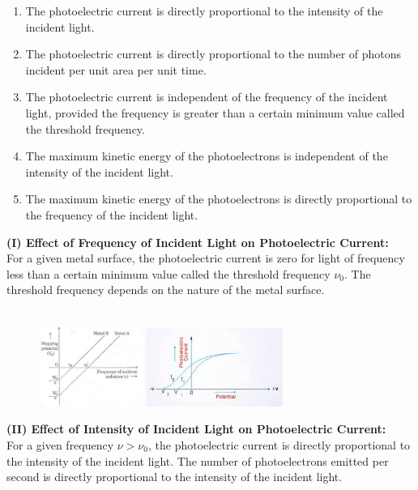 \documentclass[12pt]{article}
\numberwithin{equation}{subsection}
\begin{document}
\begin{enumerate}
    \item The photoelectric current is directly proportional to the intensity of the incident light.
    \item The photoelectric current is directly proportional to the number of photons incident per unit area per unit time.
    \item The photoelectric current is independent of the frequency of the incident light, provided the frequency is greater than a certain minimum value called the threshold frequency.
    \item The maximum kinetic energy of the photoelectrons is independent of the intensity of the incident light.
    \item The maximum kinetic energy of the photoelectrons is directly proportional to the frequency of the incident light.
\end{enumerate}

\textbf{(I) Effect of Frequency of Incident Light on Photoelectric Current:} \\
For a given metal surface, the photoelectric current is zero for light of frequency less than a certain minimum value called the threshold frequency $\nu_0$. The threshold frequency depends on the nature of the metal surface. \\~\\

\begin{figure}[htpb]
    \centering
    \includegraphics[width=0.3\textwidth]{frequency.png}
    \includegraphics[width=0.4\textwidth]{frequency2.png}
\end{figure}

\textbf{(II) Effect of Intensity of Incident Light on Photoelectric Current:} \\
For a given frequency $\nu > \nu_0$, the photoelectric current is directly proportional to the intensity of the incident light. The number of photoelectrons emitted per second is directly proportional to the intensity of the incident light. \\~\\
\end{document}
